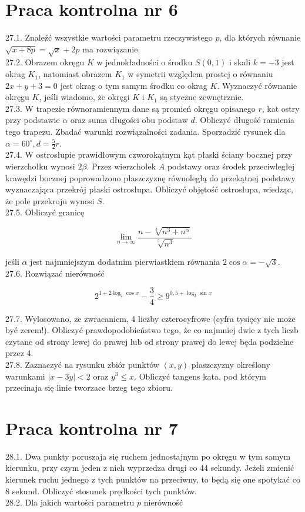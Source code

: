 \documentclass[10pt]{article}
\begin{document}
\section*{Praca kontrolna nr 6}
27.1. Znaleźć wszystkie wartości parametru rzeczywistego $p$, dla których równanie $\sqrt{x+8 p}=\sqrt{x}+2 p$ ma rozwiązanie.\\
27.2. Obrazem okręgu $K$ w jednokładności o środku $S(0,1)$ i skali $k=-3$ jest okrag $K_{1}$, natomiast obrazem $K_{1}$ w symetrii względem prostej o równaniu $2 x+y+3=0$ jest okrag o tym samym środku co okrag $K$. Wyznaczyć równanie okręgu $K$, jeśli wiadomo, że okręgi $K$ i $K_{1}$ są styczne zewnętrznie.\\
27.3. W trapezie równoramiennym dane są promień okręgu opisanego $r$, kat ostry przy podstawie $\alpha$ oraz suma długości obu podstaw $d$. Obliczyć długość ramienia tego trapezu. Zbadać warunki rozwiązalności zadania. Sporzadzić rysunek dla $\alpha=60^{\circ}, d=\frac{5}{2} r$.\\
27.4. W ostrosłupie prawidłowym czworokątnym kạt płaski ściany bocznej przy wierzchołku wynosi $2 \beta$. Przez wierzchołek $A$ podstawy oraz środek przeciwległej krawędzi bocznej poprowadzono płaszczyznę równoległą do przekątnej podstawy wyznaczająca przekrój płaski ostrosłupa. Obliczyć objętość ostrosłupa, wiedząc, że pole przekroju wynosi $S$.\\
27.5. Obliczyć granicę

$$
\lim _{n \rightarrow \infty} \frac{n-\sqrt[3]{n^{3}+n^{\alpha}}}{\sqrt[5]{n^{3}}}
$$

jeśli $\alpha$ jest najmniejszym dodatnim pierwiastkiem równania $2 \cos \alpha=-\sqrt{3}$.\\
27.6. Rozwiązać nierówność

$$
2^{1+2 \log _{2} \cos x}-\frac{3}{4} \geq 9^{0,5+\log _{3} \sin x}
$$

27.7. Wylosowano, ze zwracaniem, 4 liczby czterocyfrowe (cyfra tysięcy nie może być zerem!). Obliczyć prawdopodobieństwo tego, że co najmniej dwie z tych liczb czytane od strony lewej do prawej lub od strony prawej do lewej będa podzielne przez 4.\\
27.8. Zaznaczyć na rysunku zbiór punktów $(x, y)$ płaszczyzny określony warunkami $|x-3 y|<2$ oraz $y^{3} \leq x$. Obliczyć tangens kata, pod którym przecinaja się linie tworzace brzeg tego zbioru.

\section*{Praca kontrolna nr 7}
28.1. Dwa punkty poruszaja się ruchem jednostajnym po okręgu w tym samym kierunku, przy czym jeden z nich wyprzedza drugi co 44 sekundy. Jeżeli zmienić kierunek ruchu jednego z tych punktów na przeciwny, to będą się one spotykać co 8 sekund. Obliczyć stosunek prędkości tych punktów.\\
28.2. Dla jakich wartości parametru $p$ nierówność
\end{document}
